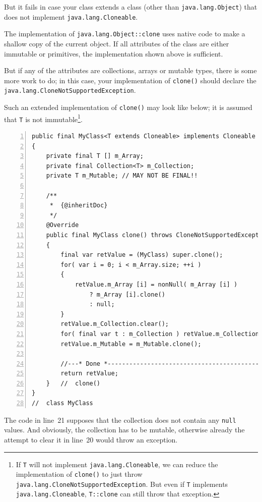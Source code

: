 \documentclass[11pt,a4paper, titlepage, parskip=half, headsepline, footsepline, cleardoublepage=current, headheight=1cm]{scrbook}
\begin{document}
But it fails in case your class extends a class (other than \lstinline|java.lang.Object|) that does not implement \lstinline|java.lang.Cloneable|.

The implementation of \lstinline|java.lang.Object::clone| uses native code to make a shallow copy of the current object. If all attributes of the class are either immutable or primitives, the implementation shown above is sufficient.

But if any of the attributes are collections, arrays or mutable types, there is some
more work to do; in this case, your implementation of \lstinline|clone()| should declare the \lstinline|java.lang.CloneNotSupportedException|.

Such an extended implementation of \lstinline|clone()| may look like below; it is assumed that \lstinline|T| is not immutable\footnote{If \lstinline|T| will not implement  \lstinline|java.lang.Cloneable|, we can reduce the implementation of \lstinline|clone()| to just throw \lstinline|java.lang.CloneNotSupportedException|. But even if \lstinline|T| implements \lstinline|java.lang.Cloneable|, \lstinline|T::clone| can still throw that exception.}.
\begin{lstlisting}[numbers=left,caption={An extended clone() Method}]
public final MyClass<T extends Cloneable> implements Cloneable
{
    private final T [] m_Array;
    private final Collection<T> m_Collection;
    private T m_Mutable; // MAY NOT BE FINAL!!
    
    /**
     *  {@inheritDoc}
     */
    @Override
    public final MyClass clone() throws CloneNotSupportedException
    {
        final var retValue = (MyClass) super.clone();
        for( var i = 0; i < m_Array.size; ++i )
        {
            retValue.m_Array [i] = nonNull( m_Array [i] ) 
                ? m_Array [i].clone() 
                : null;
        }
        retValue.m_Collection.clear();
        for( final var t : m_Collection ) retValue.m_Collection.add( t.clone() );
        retValue.m_Mutable = m_Mutable.clone();
        
        //---* Done *------------------------------------------------
        return retValue;
    }   //  clone() 
}
//  class MyClass
\end{lstlisting}

The code in line~21 supposes that the collection does not contain any \lstinline|null| values. And obviously, the collection has to be mutable, otherwise already the attempt to clear it in line~20 would throw an exception.
\end{document}
